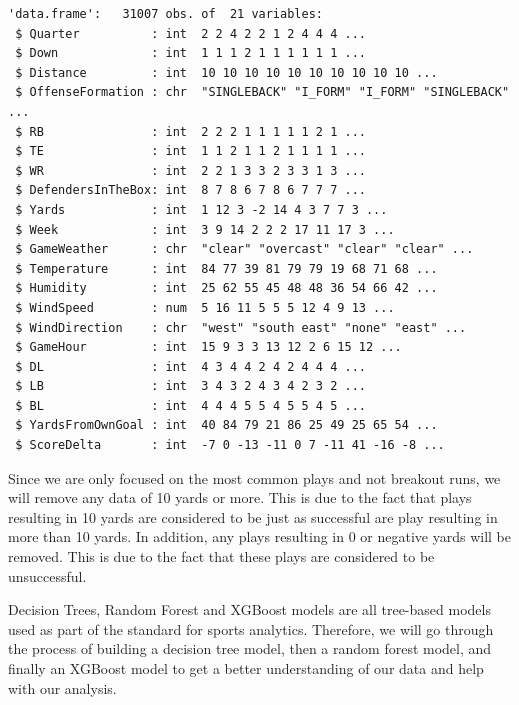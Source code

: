 \documentclass[
  super,
  preprint,
  3p]{elsarticle}
\newenvironment{Shaded}{\begin{snugshade}}{\end{snugshade}}
\newcommand{\CommentTok}[1]{\textcolor[rgb]{0.37,0.37,0.37}{#1}}
\newcommand{\DecValTok}[1]{\textcolor[rgb]{0.68,0.00,0.00}{#1}}
\newcommand{\NormalTok}[1]{\textcolor[rgb]{0.00,0.23,0.31}{#1}}
\newcommand{\OtherTok}[1]{\textcolor[rgb]{0.00,0.23,0.31}{#1}}
\newcommand{\SpecialCharTok}[1]{\textcolor[rgb]{0.37,0.37,0.37}{#1}}
\begin{document}
\begin{verbatim}
'data.frame':   31007 obs. of  21 variables:
 $ Quarter          : int  2 2 4 2 2 1 2 4 4 4 ...
 $ Down             : int  1 1 1 2 1 1 1 1 1 1 ...
 $ Distance         : int  10 10 10 10 10 10 10 10 10 10 ...
 $ OffenseFormation : chr  "SINGLEBACK" "I_FORM" "I_FORM" "SINGLEBACK" ...
 $ RB               : int  2 2 2 1 1 1 1 1 2 1 ...
 $ TE               : int  1 1 2 1 1 2 1 1 1 1 ...
 $ WR               : int  2 2 1 3 3 2 3 3 1 3 ...
 $ DefendersInTheBox: int  8 7 8 6 7 8 6 7 7 7 ...
 $ Yards            : int  1 12 3 -2 14 4 3 7 7 3 ...
 $ Week             : int  3 9 14 2 2 2 17 11 17 3 ...
 $ GameWeather      : chr  "clear" "overcast" "clear" "clear" ...
 $ Temperature      : int  84 77 39 81 79 79 19 68 71 68 ...
 $ Humidity         : int  25 62 55 45 48 48 36 54 66 42 ...
 $ WindSpeed        : num  5 16 11 5 5 5 12 4 9 13 ...
 $ WindDirection    : chr  "west" "south east" "none" "east" ...
 $ GameHour         : int  15 9 3 3 13 12 2 6 15 12 ...
 $ DL               : int  4 3 4 4 2 4 2 4 4 4 ...
 $ LB               : int  3 4 3 2 4 3 4 2 3 2 ...
 $ BL               : int  4 4 4 5 5 4 5 5 4 5 ...
 $ YardsFromOwnGoal : int  40 84 79 21 86 25 49 25 65 54 ...
 $ ScoreDelta       : int  -7 0 -13 -11 0 7 -11 41 -16 -8 ...
\end{verbatim}

Since we are only focused on the most common plays and not breakout
runs, we will remove any data of 10 yards or more. This is due to the
fact that plays resulting in 10 yards are considered to be just as
successful are play resulting in more than 10 yards. In addition, any
plays resulting in 0 or negative yards will be removed. This is due to
the fact that these plays are considered to be unsuccessful.

\begin{Shaded}
\end{Shaded}

Decision Trees, Random Forest and XGBoost models are all tree-based
models used as part of the standard for sports analytics. Therefore, we
will go through the process of building a decision tree model, then a
random forest model, and finally an XGBoost model to get a better
understanding of our data and help with our analysis.
\end{document}
